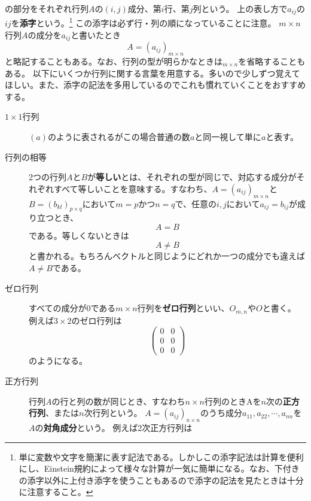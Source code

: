 \documentclass[10pt]{jsreport}
\theoremstyle{definition}%
\numberwithin{equation}{section}%
\begin{document}
の部分をそれぞれ行列$A$の$(i,j)$成分、第$i$行、第$j$列という。
上の表し方で$a_{ij}$の$ij$を{\bf 添字}という。\footnote{単に変数や文字を簡潔に表す記法である。しかしこの添字記法は計算を便利にし、Einstein規約によって様々な計算が一気に簡単になる。なお、下付きの添字以外に上付き添字を使うこともあるので添字の記法を見たときは十分に注意すること。}
この添字は必ず行・列の順になっていることに注意。
$m\times n$行列$A$の成分を$a_{ij}$と書いたとき
\begin{equation}
  A=(a_{ij})_{m\times n}
\end{equation}
と略記することもある。なお、行列の型が明らかなときは${}_{m\times n}$を省略することもある。
以下にいくつか行列に関する言葉を用意する。多いので少しずつ覚えてほしい。また、添字の記法を多用しているのでこれも慣れていくことをおすすめする。
\begin{framed}
\begin{description}
  \item[$1\times 1$行列] $(a)$のように表されるがこの場合普通の数$a$と同一視して単に$a$と表す。
  \item[行列の相等] 2つの行列$A$と$B$が{\bf 等しい}とは、それぞれの型が同じで、対応する成分がそれぞれすべて等しいことを意味する。すなわち、$A=(a_{ij})_{m\times n}$と$B=(b_{kl})_{p\times q}$において$m=p$かつ$n=q$で、任意の$i,j$において$a_{ij}=b_{ij}$が成り立つとき、
  \begin{equation}
    A=B
  \end{equation}
  である。等しくないときは
  \begin{equation}
  A\neq B 
  \end{equation}
  と書かれる。もちろんベクトルと同じようにどれか一つの成分でも違えば$A\neq B$である。
  \item[ゼロ行列] すべての成分が0である$m\times n$行列を{\bf ゼロ行列}といい、$O_{m,n}$や$O$と書く。
  例えば$3\times 2$のゼロ行列は
  \begin{equation}\left( 
    \begin{matrix}
      0 & 0\\
      0 & 0\\
      0 & 0
    \end{matrix}\right) 
  \end{equation}
  のようになる。
  \item[正方行列] 行列$A$の行と列の数が同じとき、すなわち$n\times n$行列のときAを$n$次の{\bf 正方行列}、または$n$次行列という。
 $A=(a_{ij})_{n\times n}$のうち成分$a_{11},a_{22},\cdots,a_{nn}$を$A$の{\bf 対角成分}という。
  例えば2次正方行列は
   \begin{equation}

\end{equation}
\end{description}
\end{framed}
\end{document}
